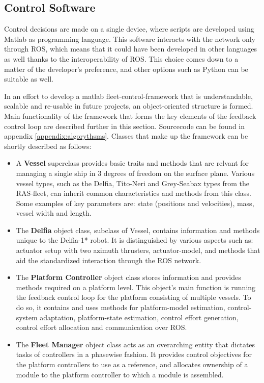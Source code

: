 \subsection{Control Software}
\label{sec:controlSoftware}
Control decisions are made on a single device, where scripts are developed using Matlab as programming language. This software interacts with the network only through ROS, which means that it could have been developed in other languages as well thanks to the interoperability of ROS. This choice comes down to a matter of the developer's preference, and other options such as Python can be suitable as well.

In an effort to develop a matlab fleet-control-framework that is understandable, scalable and re-usable in future projects, an object-oriented structure is formed. Main functionality of the framework that forms the key elements of the feedback control loop are described further in this section. Sourcecode can be found in appendix \ref{appendix:algorythsms}. Classes that make up the framework  can be shortly described as follows:
\begin{itemize}
	\item A \textbf{Vessel} superclass provides basic traits and methods that are relvant for managing a single ship in 3 degrees of freedom on the surface plane. Various vessel types, such as the Delfia, Tito-Neri and Grey-Seabax types from the RAS-fleet, can inherit common characteristics and methods from this class. Some examples of key parameters are: state (positions and velocities), mass, vessel width and length. 
	\item The \textbf{Delfia} object class, subclass of Vessel, contains information and methods unique to the Delfia-1* robot. It is distinguished by various aspects such as: actuator setup with two azimuth thrusters, actuator-model, and methods that aid the standardized interaction through the ROS network. 
	\item The \textbf{Platform Controller} object class stores information and provides methods required on a platform level. This object's main function is running the feedback control loop for the platform consisting of multiple vessels. To do so, it contains and uses methods for platform-model estimation, control-system adaptation, platform-state estimation,  control effort generation, control effort allocation and communication over ROS. 
	\item The \textbf{Fleet Manager} object class acts as an overarching entity that dictates tasks of  controllers in a phasewise fashion. It provides control objectives for the platform controllers to use as a reference, and allocates ownership of a module to the platform controller to which a module is assembled. 
\end{itemize}

